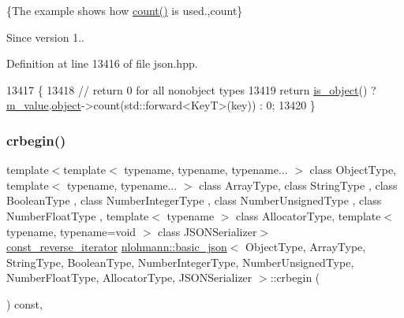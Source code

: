 \{The example shows how {\ttfamily \hyperlink{classnlohmann_1_1basic__json_a0d74bfcf65662f1d66d14c34b0027098}{count()}} is used.,count\}

\begin{DoxySince}{Since}
version 1.. 
\end{DoxySince}


Definition at line 13416 of file json.\+hpp.


\begin{DoxyCode}
13417     \{
13418         \textcolor{comment}{// return 0 for all nonobject types}
13419         \textcolor{keywordflow}{return} \hyperlink{classnlohmann_1_1basic__json_af8f511af124e82e4579f444b4175787c}{is\_object}() ? \hyperlink{classnlohmann_1_1basic__json_aeb0814f76966f99290cb29e127c90a77}{m\_value}.\hyperlink{unionnlohmann_1_1basic__json_1_1json__value_a4a2209bb26e7088cd36bf24824ab5521}{object}->count(std::forward<KeyT>(key)) : 0;
13420     \}
\end{DoxyCode}
\mbox{\label{classnlohmann_1_1basic__json_a1e0769d22d54573f294da0e5c6abc9de}} 
\subsubsection{\texorpdfstring{crbegin()}{crbegin()}}
{\footnotesize\ttfamily template$<$template$<$ typename, typename, typename... $>$ class Object\+Type, template$<$ typename, typename... $>$ class Array\+Type, class String\+Type , class Boolean\+Type , class Number\+Integer\+Type , class Number\+Unsigned\+Type , class Number\+Float\+Type , template$<$ typename $>$ class Allocator\+Type, template$<$ typename, typename=void $>$ class J\+S\+O\+N\+Serializer$>$ \\
\hyperlink{classnlohmann_1_1basic__json_a72be3c24bfa24f0993d6c11af03e7404}{const\+\_\+reverse\+\_\+iterator} \hyperlink{classnlohmann_1_1basic__json}{nlohmann\+::basic\+\_\+json}$<$ Object\+Type, Array\+Type, String\+Type, Boolean\+Type, Number\+Integer\+Type, Number\+Unsigned\+Type, Number\+Float\+Type, Allocator\+Type, J\+S\+O\+N\+Serializer $>$\+::crbegin (\begin{DoxyParamCaption}{ }\end{DoxyParamCaption}) const\hspace{0.3cm}{\ttfamily [inline]}, {\ttfamily [noexcept]}}



